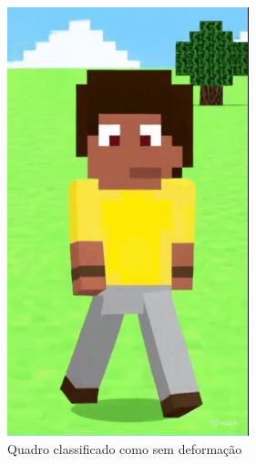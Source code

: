\begin{figure}[htbp]
    \centering
    \caption{\small Quadros do Vídeo 1 (3D) em cada um dos níveis de deformação}
    \label{fig:viduNiveisDeformacao1}
    \begin{subfigure}{0.32\linewidth}
        \centering
        \includegraphics[width=0.8\linewidth]{figs/vidu/1sem.png}
        \caption{\small Quadro classificado como sem deformação}
        \label{fig:viduDeformacao1Sem}
    \end{subfigure}
    \begin{subfigure}{0.32\linewidth}
        \centering

\end{subfigure}
\end{figure}
